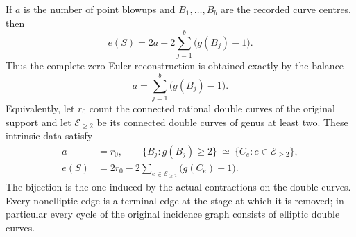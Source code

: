 \begin{proposition}
If $a$ is the number of point blowups and $B_1,\ldots,B_b$
are the recorded curve centres, then
\[
                 e(S)=2a-2\sum_{j=1}^b\bigl(g(B_j)-1\bigr).
\tag{C.NT.2}\label{cdp:eq:C.NT.2}
\]
Thus the complete zero-Euler reconstruction is obtained
exactly by the balance
\[
                       a=\sum_{j=1}^b\bigl(g(B_j)-1\bigr).
\tag{C.NT.3}\label{cdp:eq:C.NT.3}
\]
Equivalently, let $r_0$ count the connected rational
double curves of the original support and let
$\mathcal E_{\ge2}$ be its connected double curves of
genus at least two. These intrinsic data satisfy
\[
 \begin{split}
 a&=r_0,\qquad
 \{B_j:g(B_j)\ge2\}
       \ \simeq\ \{C_e:e\in\mathcal E_{\ge2}\},\\
 e(S)&=2r_0-2\sum_{e\in\mathcal E_{\ge2}}
                                      \bigl(g(C_e)-1\bigr).
 \end{split}
\tag{C.NT.4}\label{cdp:eq:C.NT.4}
\]
The bijection is the one induced by the actual contractions
on the double curves. Every nonelliptic edge is a terminal
edge at the stage at which it is removed; in particular
every cycle of the original incidence graph consists of
elliptic double curves.
\end{proposition}

